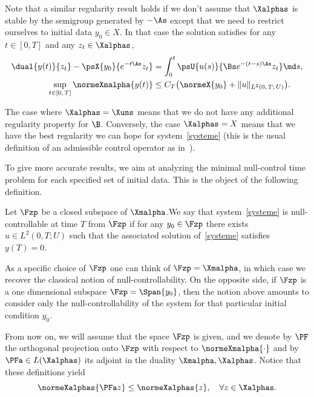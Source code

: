 \begin{rema}\label{Rem:Xdiamond_stable}
Note that a similar regularity result holds if we don't assume that $\Xalphas$ is stable by the semigroup generated by $-\As$ except that we need to restrict ourselves to initial data $y_0\in X$. In that case the solution satisfies for any $t \in [0,T]$ and any $z_t \in \Xalphas$,
\begin{align*}
\dual{y(t)}{z_t} - \psX{y_0}{e^{-t\As} z_t} &= \int_0^t \psU{u(s)}{ \Bs e^{-(t-s) \As} z_t} \md s,\\
\sup\limits_{t \in [0,\,T]} \normeXmalpha{y(t)} &\leq C_T \big(\normeX{y_0} + \| u \|_{L^2(0,\,T;\,U)} \big).
\end{align*}
\end{rema}

\begin{rema}
The case where $\Xalphas=\Xuns$ means that we do not have any additional regularity property for $\B$. Conversely, the case $\Xalphas=X$ means that we have the best regularity we can hope for system~\eqref{systeme} (this is the usual definition of an admissible control operator as in~\cite{CoronBook,TucsnakWeissBook}).
\end{rema}


To give more accurate results, we aim at analyzing the minimal null-control time problem for each specified set of initial data. This is the object of the following definition.

\begin{defi}
Let $\Fzp$ be a closed subspace of $\Xmalpha$.We say that system~\eqref{systeme} is null-controllable at time $T$ from $\Fzp$ if for any $y_0 \in \Fzp$ there exists $u \in L^2(0,T ; U)$ such that the associated solution of~\eqref{systeme} satisfies $y(T) = 0$.
\end{defi}

As a specific choice of $\Fzp$ one can think of $\Fzp = \Xmalpha$, in which case we recover the classical notion of null-controllability. On the opposite side, if $\Fzp$ is a one dimensional subspace $\Fzp = \Span\{ y_0 \}$, then the notion above amounts to consider only the null-controllability of the system for that particular initial condition $y_0$.


From now on, we will assume that the space $\Fzp$ is given, and we denote by $\PF$ the orthogonal projection onto $\Fzp$ with respect to $\normeXmalpha{\cdot}$ and by $\PFa\in L(\Xalphas)$ its adjoint in the duality $\Xmalpha, \Xalphas$. Notice that these definitions yield
\begin{equation}\label{PFa_norme_un}
\normeXalphas{\PFa z} \leq \normeXalphas{z}, \quad \forall z \in \Xalphas.
\end{equation}




